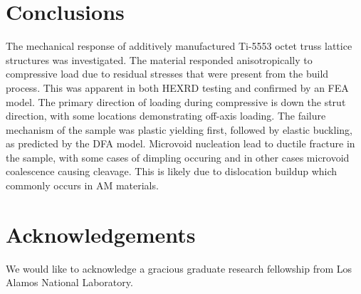 \section{Conclusions}
The mechanical response of additively manufactured Ti-5553 octet truss lattice structures was investigated. The material responded anisotropically to compressive load due to residual stresses that were present from the build process. This was apparent in both HEXRD testing and confirmed by an FEA model.  The primary direction of loading during compressive is down the strut direction, with some locations demonstrating off-axis loading. The failure mechanism of the sample was plastic yielding first, followed by elastic buckling, as predicted by the DFA model. Microvoid nucleation lead to ductile fracture in the sample, with some cases of dimpling occuring and in other cases microvoid coalescence causing cleavage. This is likely due to dislocation buildup which commonly occurs in AM materials.

\section*{Acknowledgements}
We would like to acknowledge a gracious graduate research fellowship from Los Alamos National Laboratory.
